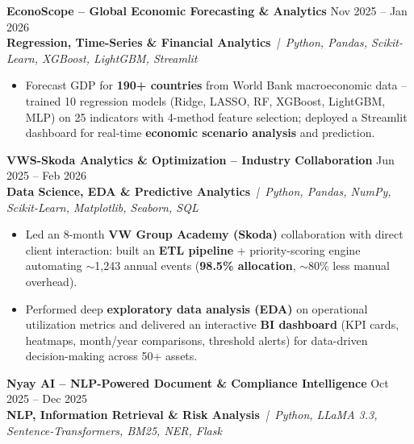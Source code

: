 \documentclass[a4paper,10pt]{article}
\newcommand{\projectEntry}[4]{%
  \vspace{1pt}%
  \noindent\textbf{\color{HeaderDark}#1} \hfill {\small\color{SubText}#2}\\[-4pt]%
  {\scriptsize\color{AccentTeal}\textbf{#3}} {\scriptsize\color{TechTag}\textit{\,|\, #4}}%
  \vspace{0pt}\par%
}
\begin{document}
\vspace{1pt}

\projectEntry{EconoScope -- Global Economic Forecasting \& Analytics}
  {Nov 2025 -- Jan 2026}
  {Regression, Time-Series \& Financial Analytics}
  {Python, Pandas, Scikit-Learn, XGBoost, LightGBM, Streamlit}

\begin{itemize}[leftmargin=14pt, itemsep=0pt, parsep=0pt, topsep=1pt, label={\color{BulletColor}\textbf{--}}]
  \item {\small Forecast GDP for \textbf{190+ countries} from World Bank macroeconomic data -- trained 10 regression models (Ridge, LASSO, RF, XGBoost, LightGBM, MLP) on 25 indicators with 4-method feature selection; deployed a Streamlit dashboard for real-time \textbf{economic scenario analysis} and prediction.}
\end{itemize}

\vspace{1pt}

\projectEntry{VWS-Skoda Analytics \& Optimization -- Industry Collaboration}
  {Jun 2025 -- Feb 2026}
  {Data Science, EDA \& Predictive Analytics}
  {Python, Pandas, NumPy, Scikit-Learn, Matplotlib, Seaborn, SQL}

\begin{itemize}[leftmargin=14pt, itemsep=0pt, parsep=0pt, topsep=1pt, label={\color{BulletColor}\textbf{--}}]
  \item {\small Led an 8-month \textbf{VW Group Academy (Skoda)} collaboration with direct client interaction: built an \textbf{ETL pipeline} + priority-scoring engine automating $\sim$1,243 annual events (\textbf{98.5\% allocation}, $\sim$80\% less manual overhead).}
  \item {\small Performed deep \textbf{exploratory data analysis (EDA)} on operational utilization metrics and delivered an interactive \textbf{BI dashboard} (KPI cards, heatmaps, month/year comparisons, threshold alerts) for data-driven decision-making across 50+ assets.}
\end{itemize}

\vspace{1pt}

\projectEntry{Nyay AI -- NLP-Powered Document \& Compliance Intelligence}
  {Oct 2025 -- Dec 2025}
  {NLP, Information Retrieval \& Risk Analysis}
  {Python, LLaMA 3.3, Sentence-Transformers, BM25, NER, Flask}
\end{document}
